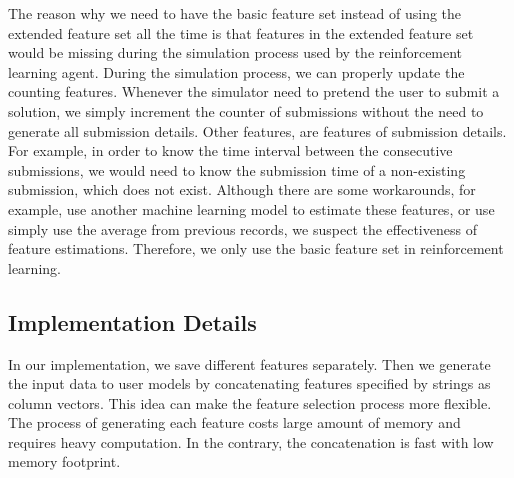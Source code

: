         The reason why we need to have the basic feature set
        instead of using the extended feature set all the time
        is that features in the extended feature set would be missing
        during the simulation process used by the reinforcement learning agent.
        During the simulation process, we can properly update the counting features.
        Whenever the simulator need to pretend the user to submit a solution,
        we simply increment the counter of submissions without the need to generate all submission details.
        Other features, are features of submission details.
        For example, in order to know the time interval between the consecutive submissions,
        we would need to know the submission time of a non-existing submission,
        which does not exist.
        Although there are some workarounds, for example,
        use another machine learning model to estimate these features,
        or use simply use the average from previous records,
        we suspect the effectiveness of feature estimations.
        Therefore, we only use the basic feature set in reinforcement learning.

    \subsection{Implementation Details}

        In our implementation, we save different features separately.
        Then we generate the input data to user models by concatenating features specified by strings as column vectors.
        This idea can make the feature selection process more flexible.
        The process of generating each feature costs large amount of memory and requires heavy computation.
        In the contrary, the concatenation is fast with low memory footprint.









